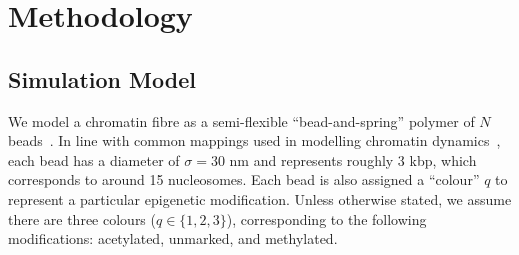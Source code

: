\documentclass[12pt]{article}
\begin{document}
\section{Methodology}
\subsection{Simulation Model}
We model a chromatin fibre as a semi-flexible ``bead-and-spring'' polymer of $N$ beads~\cite{kremer1990}. In line with common mappings used in modelling chromatin dynamics~\cite{rosa2008, mirny2011, brackley2016, michieletto2016}, each bead has a diameter of $\sigma = 30$ nm and represents roughly 3 kbp, which corresponds to around 15 nucleosomes. Each bead is also assigned a ``colour'' $q$ to represent a particular epigenetic modification. Unless otherwise stated, we assume there are three colours ($q \in \{1, 2, 3\}$), corresponding to the following modifications: acetylated, unmarked, and methylated. 
\end{document}
